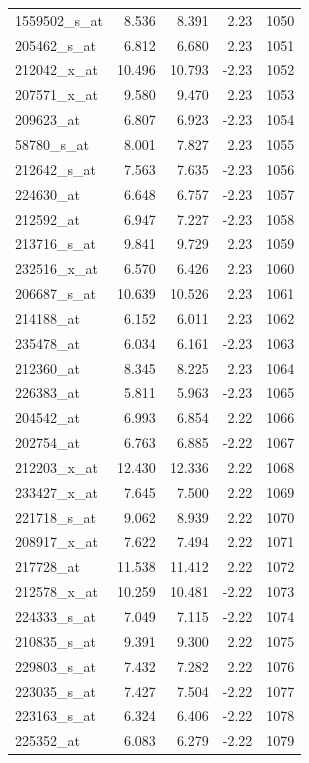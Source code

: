 \begin{footnotesize}
\begin{longtable}{lrrrr}
1559502\_s\_at & 8.536 & 8.391 & 2.23 & 1050 \\
205462\_s\_at & 6.812 & 6.680 & 2.23 & 1051 \\
212042\_x\_at & 10.496 & 10.793 & -2.23 & 1052 \\
207571\_x\_at & 9.580 & 9.470 & 2.23 & 1053 \\
209623\_at & 6.807 & 6.923 & -2.23 & 1054 \\
58780\_s\_at & 8.001 & 7.827 & 2.23 & 1055 \\
212642\_s\_at & 7.563 & 7.635 & -2.23 & 1056 \\
224630\_at & 6.648 & 6.757 & -2.23 & 1057 \\
212592\_at & 6.947 & 7.227 & -2.23 & 1058 \\
213716\_s\_at & 9.841 & 9.729 & 2.23 & 1059 \\
232516\_x\_at & 6.570 & 6.426 & 2.23 & 1060 \\
206687\_s\_at & 10.639 & 10.526 & 2.23 & 1061 \\
214188\_at & 6.152 & 6.011 & 2.23 & 1062 \\
235478\_at & 6.034 & 6.161 & -2.23 & 1063 \\
212360\_at & 8.345 & 8.225 & 2.23 & 1064 \\
226383\_at & 5.811 & 5.963 & -2.23 & 1065 \\
204542\_at & 6.993 & 6.854 & 2.22 & 1066 \\
202754\_at & 6.763 & 6.885 & -2.22 & 1067 \\
212203\_x\_at & 12.430 & 12.336 & 2.22 & 1068 \\
233427\_x\_at & 7.645 & 7.500 & 2.22 & 1069 \\
221718\_s\_at & 9.062 & 8.939 & 2.22 & 1070 \\
208917\_x\_at & 7.622 & 7.494 & 2.22 & 1071 \\
217728\_at & 11.538 & 11.412 & 2.22 & 1072 \\
212578\_x\_at & 10.259 & 10.481 & -2.22 & 1073 \\
224333\_s\_at & 7.049 & 7.115 & -2.22 & 1074 \\
210835\_s\_at & 9.391 & 9.300 & 2.22 & 1075 \\
229803\_s\_at & 7.432 & 7.282 & 2.22 & 1076 \\
223035\_s\_at & 7.427 & 7.504 & -2.22 & 1077 \\
223163\_s\_at & 6.324 & 6.406 & -2.22 & 1078 \\
225352\_at & 6.083 & 6.279 & -2.22 & 1079 \\

\end{longtable}
\end{footnotesize}
